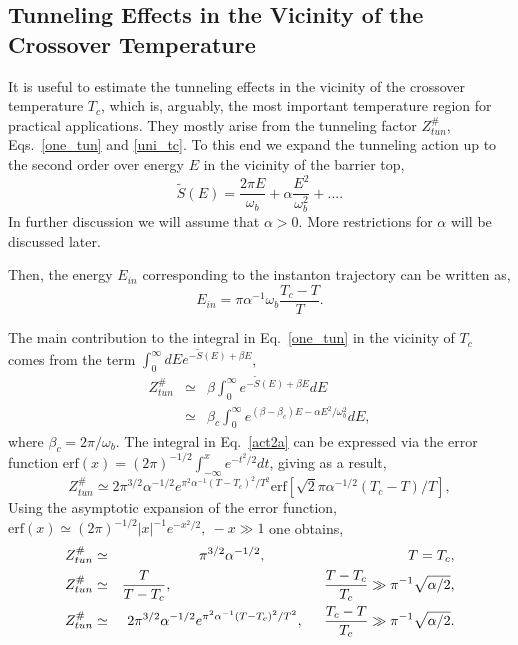 \documentclass[journal=jpcafh,manuscript=article]{achemso}
\begin{document}
\subsection{Tunneling Effects in the Vicinity of the Crossover
  Temperature}

It is useful to estimate the tunneling effects in the vicinity of the
crossover temperature
$T_c$,\cite{affleck81,cao96,kryvohuz11,kryvohuz13,barcia14,mcconnell17}
which is, arguably, the most important temperature region for
practical applications. They mostly arise from the tunneling factor
$Z^\#_{tun}$, Eqs.~\ref{one_tun} and \ref{uni_tc}.  To this end we
expand the tunneling action up to the second order over energy $E$ in
the vicinity of the barrier top,
\begin{equation}
  \label{act_exp}
  \tilde{S}(E)=\frac{2\pi E}{\omega_b}+\alpha\frac{E^2}{\omega_b^2}+... .
\end{equation}
In further discussion we will assume that $\alpha > 0$. More
restrictions for $\alpha$ will be discussed later.

Then, the energy $E_{in}$ corresponding to the instanton trajectory can be
written as,
\begin{equation}
  \label{ins_en}
  E_{in}=\pi\alpha^{-1}\omega_b\frac{T_c-T}{T}.
\end{equation}

The main contribution to the integral in Eq.~\ref{one_tun} in the
vicinity of $T_c$ comes from the term
$\int_0^{\infty}dEe^{-\tilde{S}(E)+\beta E}$,
\begin{eqnarray}
  \label{act2}
  Z^\#_{tun}&\simeq&\beta\int_0^{\infty}e^{-\tilde{S}(E)+\beta E}dE
  \\
  \label{act2a}
            &\simeq&\beta_c\int_0^{\infty}e^{(\beta-\beta_c)E-\alpha E^2/\omega_b^2}dE,
\end{eqnarray}
where $\beta_c=2\pi/\omega_b$.  The integral in Eq.~\ref{act2a} can be
expressed via the error function
$\mbox{erf}(x)=(2\pi)^{-1/2}\int_{-\infty}^xe^{-t^2/2}dt$, giving as a
result,\cite{affleck81}
\begin{equation}
  \label{act3}
  Z^\#_{tun}\simeq2\pi^{3/2}\alpha^{-1/2}e^{\pi^2\alpha^{-1}(T-T_c)^2/T^2}
  \mbox{erf}\!\left[\sqrt{2}\pi\alpha^{-1/2}(T_c-T)/T\right],
\end{equation}
Using the asymptotic expansion of the error function,
$\mbox{erf}(x)\simeq(2\pi)^{-1/2}|x|^{-1}e^{-x^2/2},\ -x\gg1$
one obtains,
\begin{eqnarray}
  \label{act4}
  Z^\#_{tun}&\simeq&\pi^{3/2}\alpha^{-1/2},\makebox[1.4in]{}T=T_c ,
  \\
  \label{act5}
  Z^\#_{tun}&\simeq&\frac{T}{T-T_c},\makebox[1.5in]{}\frac{T-T_c}{T_c}\gg\pi^{-1}\sqrt{\alpha/2},
  \\
  \label{act6}
  Z^\#_{tun}&\simeq&2\pi^{3/2}\alpha^{-1/2}e^{\pi^2\alpha^{-1}(T-T_c)^2/T^2},\makebox[0.2in]{}
                     \frac{T_c-T}{T_c}\gg\pi^{-1}\sqrt{\alpha/2}.
\end{eqnarray}
\end{document}
